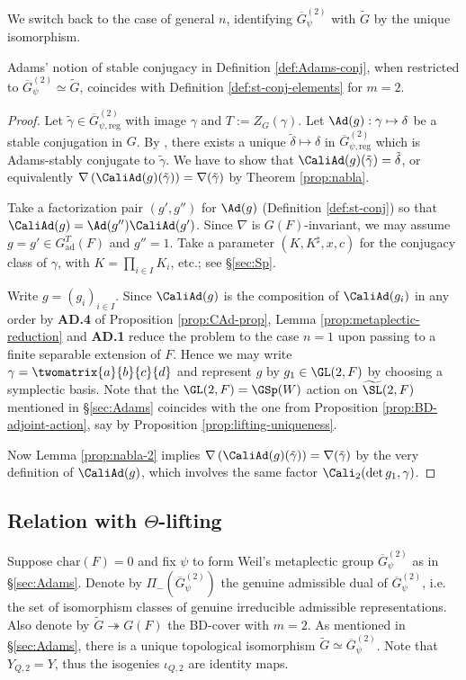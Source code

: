 \documentclass[a4paper,10pt]{article}
\begin{document}
We switch back to the case of general $n$, identifying $\overline{G}_\psi^{(2)}$ with $\tilde{G}$ by the unique isomorphism.
\begin{theorem}\label{prop:st-conj-twofold}
	Adams' notion of stable conjugacy in Definition \ref{def:Adams-conj}, when restricted to $\overline{G}_\psi^{(2)} \simeq \tilde{G}$, coincides with Definition \ref{def:st-conj-elements} for $m=2$.
\end{theorem}
\begin{proof}
	Let $\tilde{\gamma} \in \overline{G}_{\psi, \text{reg}}^{(2)}$ with image $\gamma$ and $T := Z_G(\gamma)$. Let $\Ad(g): \gamma \mapsto \delta$ be a stable conjugation in $G$. By \cite[Lemme 5.7]{Li11}, there exists a unique $\tilde{\delta} \mapsto \delta$ in $\overline{G}_{\psi, \mathrm{reg}}^{(2)}$ which is Adams-stably conjugate to $\tilde{\gamma}$. We have to show that $\CaliAd(g)(\tilde{\gamma}) = \tilde{\delta}$, or equivalently $\nabla\left(\CaliAd(g)(\tilde{\gamma})\right) = \nabla(\tilde{\gamma})$ by Theorem \ref{prop:nabla}.
	
	Take a factorization pair $(g', g'')$ for $\Ad(g)$ (Definition \ref{def:st-conj}) so that $\CaliAd(g) = \Ad(g'') \CaliAd(g')$. Since $\nabla$ is $G(F)$-invariant, we may assume $g = g' \in G^T_\text{ad}(F)$ and $g''=1$. Take a parameter $(K, K^\sharp, x, c)$ for the conjugacy class of $\gamma$, with $K = \prod_{i \in I} K_i$, etc.; see \S\ref{sec:Sp}.
	
	Write $g = (g_i)_{i \in I}$. Since $\CaliAd(g)$ is the composition of $\CaliAd(g_i)$ in any order by \textbf{AD.4} of Proposition \ref{prop:CAd-prop}, Lemma \ref{prop:metaplectic-reduction} and \textbf{AD.1} reduce the problem to the case $n=1$ upon passing to a finite separable extension of $F$. Hence we may write $\gamma = \twomatrix{a}{b}{c}{d}$ and represent $g$ by $g_1 \in \GL(2,F)$ by choosing a symplectic basis. Note that the $\GL(2,F) = \GSp(W)$ action on $\widetilde{\SL}(2,F)$ mentioned in \S\ref{sec:Adams} coincides with the one from Proposition \ref{prop:BD-adjoint-action}, say by Proposition \ref{prop:lifting-uniqueness}.
	
	Now Lemma \ref{prop:nabla-2} implies $\nabla\left(\CaliAd(g)(\tilde{\gamma})\right) = \nabla(\tilde{\gamma})$ by the very definition of $\CaliAd(g)$, which involves the same factor $\Cali_2(\det g_1, \gamma)$.
\end{proof}

\subsection{Relation with \texorpdfstring{$\Theta$}{Theta}-lifting}\label{sec:theta}
Suppose $\text{char}(F)=0$ and fix $\psi$ to form Weil's metaplectic group $\overline{G}_\psi^{(2)}$ as in \S\ref{sec:Adams}. Denote by $\Pi_-(\overline{G}_\psi^{(2)})$ the genuine admissible dual of $\overline{G}_\psi^{(2)}$, i.e. the set of isomorphism classes of genuine irreducible admissible representations. Also denote by $\tilde{G} \twoheadrightarrow G(F)$ the BD-cover with $m=2$. As mentioned in \S\ref{sec:Adams}, there is a unique topological isomorphism $\tilde{G} \simeq \overline{G}^{(2)}_\psi$. Note that $Y_{Q,2} = Y$, thus the isogenies $\iota_{Q,2}$ are identity maps.
\end{document}
